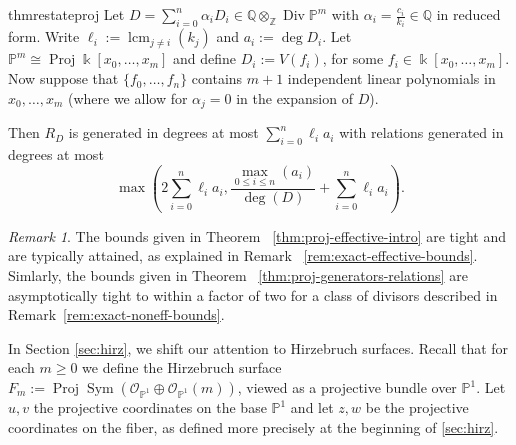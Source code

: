 \documentclass{amsart}
\theoremstyle{plain}
\theoremstyle{definition}
\theoremstyle{remark}
\newtheorem{rem}[thm]{Remark}
\numberwithin{equation}{subsection}
\newcommand\bq{{\mathbb Q}}
\newcommand\bp{{\mathbb P}}
\newcommand\bz{{\mathbb Z}}
\newcommand\bk{{\Bbbk}}
\newcommand\sco{{\mathscr O}}
\DeclareMathOperator{\sym}{Sym}
\DeclareMathOperator\di{Div}
\newcommand\bida{a}
\DeclareMathOperator{\proj}{Proj}
\DeclareMathOperator{\lcm}{lcm}
\begin{document}
\begin{restatable}{thm}{restateproj}
\label{thm:proj-generators-relations}
Let $D = \sum_{i = 0}^n \alpha_i D_i \in \bq \otimes_\bz \di \bp^m$
with $\alpha_i = \frac{c_i}{k_i}\in \bq$ in reduced form. Write $\ell_i := \lcm
_{j \ne i}(k_j)$ and $a_i := \deg D_i$. Let $\bp^m \cong \proj
\bk[x_0, \ldots, x_m]$ and define $D_i := V(f_i)$, for some $f_i \in \bk[x_0, \ldots, 
x_m]$. Now suppose that $\{f_0, \ldots, f_n\}$ contains $m + 1$ independent 
linear polynomials in $x_0, \ldots, x_m$ {\rm(}where we allow for 
$\alpha_j = 0$ in the expansion of $D${\rm)}.

Then $R_D$ is generated in degrees at most 
$\sum_{i = 0}^n \ell_i a_i$
with relations generated in degrees at most
\[
	\max \left(2 \sum_{i=0}^n \ell_i a_i, \frac{\max_{0\le i \le n}
	(	\bida_i)}{\deg(D)} + \sum_{i=0}^n \ell_i a_i \right).
\]
\end{restatable}

\begin{rem}
\label{rem:proj-tight-bounds}
The bounds
given in Theorem ~\ref{thm:proj-effective-intro}
are tight and are typically attained, as explained in
Remark ~\ref{rem:exact-effective-bounds}.
Simlarly, the bounds given in Theorem 
~\ref{thm:proj-generators-relations} are asymptotically
tight to within a factor of two 
for a class of divisors described in
Remark~\ref{rem:exact-noneff-bounds}.
\end{rem}

In Section \ref{sec:hirz}, we shift our attention to Hirzebruch surfaces. Recall that for each $m \geq 0$ we define the
Hirzebruch surface $F_m := \proj \sym (\sco_{\bp^1} \oplus
\sco_{\bp^1}(m))$, viewed as a projective bundle over $\bp^1$.
Let $u,v$ the projective coordinates on the base $\bp^1$ and let $z,w$ be the projective coordinates
on the fiber, as defined more precisely at the beginning of
\ref{sec:hirz}.
\end{document}
